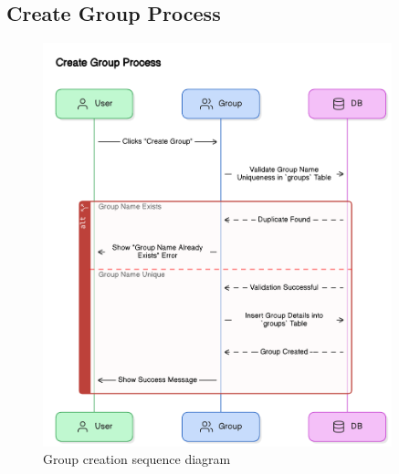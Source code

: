 \subsection{Create Group Process}
\begin{figure}[H]
    \centering
    \includegraphics[width=0.9\textwidth]{latex-doc/images/sequence_diagrams/create_group_process.png}
    \caption{Group creation sequence diagram}
    \label{fig:create_group}
\end{figure}

